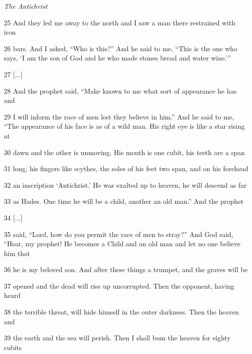 \par \textit{The Antichrist}

\par 25 And they led me away to the north and I saw a man there restrained with iron

\par 26 bars. And I asked, “Who is this?” And he said to me, “This is the one who says, ‘I am the son of God and he who made stones bread and water wine.’”

\par 27 [...]

\par 28 And the prophet said, “Make known to me what sort of appearance he has and

\par 29 I will inform the race of men lest they believe in him.” And he said to me, “The appearance of his face is as of a wild man. His right eye is like a star rising at

\par 30 dawn and the other is unmoving. His mouth is one cubit, his teeth are a span

\par 31 long, his fingers like scythes, the soles of his feet two span, and on his forehead

\par 32 an inscription ‘Antichrist.’ He was exalted up to heaven, he will descend as far

\par 33 as Hades. One time he will be a child, another an old man.” And the prophet

\par 34 [...]

\par 35 said, “Lord, how do you permit the race of men to stray?” And God said, “Hear, my prophet! He becomes a Child and an old man and let no one believe him that

\par 36 he is my beloved son. And after these things a trumpet, and the graves will be

\par 37 opened and the dead will rise up uncorrupted. Then the opponent, having heard

\par 38 the terrible threat, will hide himself in the outer darkness. Then the heaven and

\par 39 the earth and the sea will perish. Then I shall bum the heaven for eighty cubits

